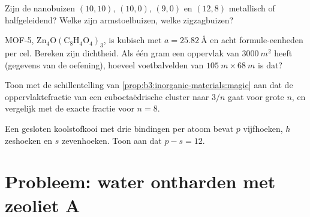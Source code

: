 \begin{exercise}[$\star\star$]\label{exo:b3:inorganic-materials:9}
Zijn de nanobuizen $(10, 10)$, $(10, 0)$, $(9, 0)$ en $(12, 8)$ metallisch of halfgeleidend? Welke
zijn armstoelbuizen, welke zigzagbuizen?
\end{exercise}

\begin{exercise}[$\star\star\star$]\label{exo:b3:inorganic-materials:10}
MOF-5, $\mathrm{Zn_4O(C_8H_4O_4)_3}$, is kubisch met $a = \qty{25.82}{\angstrom}$ en acht formule-eenheden per cel.
Bereken zijn dichtheid. Als één gram een oppervlak van $\qty{3000}{m^2}$ heeft (gegevens van de
oefening), hoeveel voetbalvelden van $\qty{105}{m} \times \qty{68}{m}$ is dat?
\end{exercise}

\begin{exercise}[$\star\star\star$]\label{exo:b3:inorganic-materials:11}
Toon met de schillentelling van \cref{prop:b3:inorganic-materials:magic}
aan dat de oppervlaktefractie van een cuboctaëdrische cluster naar $3/n$ gaat voor grote $n$, en
vergelijk met de exacte fractie voor $n = 8$.
\end{exercise}

\begin{exercise}[$\star\star\star$]\label{exo:b3:inorganic-materials:12}
Een gesloten koolstofkooi met drie bindingen per atoom bevat $p$ vijfhoeken, $h$ zeshoeken
en $s$ zevenhoeken. Toon aan dat $p - s = 12$.
\end{exercise}

\section{Probleem: water ontharden met zeoliet A}

